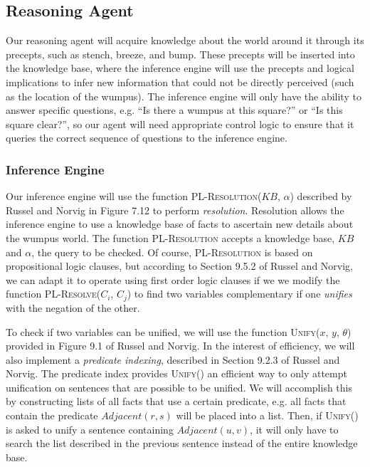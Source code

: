 \documentclass{article}
\begin{document}
		\subsection{Reasoning Agent}
		\label{reason}
		
			Our reasoning agent will acquire knowledge about the world around it through its precepts, such as stench, breeze, and bump. These precepts will be inserted into the knowledge base, where the inference engine will use the precepts and logical implications to infer new information that could not be directly perceived (such as the location of the wumpus). The inference engine will only have the ability to answer specific questions, e.g. ``Is there a wumpus at this square?'' or ``Is this square clear?'', so our agent will need appropriate control logic to ensure that it queries the correct sequence of questions to the inference engine.  
		
			\subsubsection{Inference Engine}
			\label{inference}
			
				Our inference engine will use the function \textsc{PL-Resolution}($KB$, $\alpha$) described by Russel and Norvig in Figure 7.12 \cite{ai} to perform \textit{resolution}. 
				Resolution allows the inference engine to use a knowledge base of facts to ascertain new details about the wumpus world. 
				The function \textsc{PL-Resolution} accepts a knowledge base, $KB$ and $\alpha$, the query to be checked. Of course, \textsc{PL-Resolution} is based on propositional logic clauses, but according to Section 9.5.2 of Russel and Norvig, we can adapt it to operate using first order logic clauses if we we modify the function \textsc{PL-Resolve($C_i$, $C_j$)} to find two variables complementary if one \textit{unifies} with the negation of the other. 
				
				To check if two variables can be unified, we will use the function \textsc{Unify}($x$, $y$, $\theta$) provided in Figure 9.1 of Russel and Norvig.
				In the interest of efficiency, we will also implement a \textit{predicate indexing}, described in Section 9.2.3 of Russel and Norvig\cite{ai}.
				The predicate index provides \textsc{Unify}() an efficient way to only attempt unification on sentences that are possible to be unified. 
				We will accomplish this by constructing lists of all facts that use a certain predicate, e.g. all facts that contain the predicate $Adjacent(r,s)$ will be placed into a list.
				Then, if \textsc{Unify()} is asked to unify a sentence containing $Adjacent(u,v)$, it will only have to search the list described in the previous sentence instead of the entire knowledge base.
				
\end{document}
